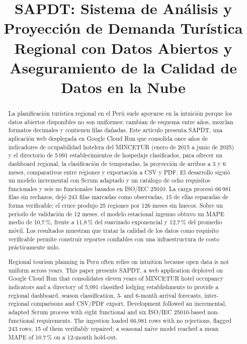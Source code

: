 \documentclass[conference]{IEEEtran}
\begin{document}
\title{SAPDT: Sistema de Análisis y Proyección de Demanda Turística Regional con Datos Abiertos y Aseguramiento de la Calidad de Datos en la Nube}

\author{
}

\maketitle

\begin{abstract}
La planificación turística regional en el Perú suele apoyarse en la intuición porque los datos abiertos disponibles no son uniformes: cambian de esquema entre años, mezclan formatos decimales y contienen filas dañadas. Este artículo presenta SAPDT, una aplicación web desplegada en Google Cloud Run que consolida once años de indicadores de ocupabilidad hotelera del MINCETUR (enero de 2015 a junio de 2025) y el directorio de 5\,091 establecimientos de hospedaje clasificados, para ofrecer un dashboard regional, la clasificación de temporadas, la proyección de arribos a 3 y 6 meses, comparativos entre regiones y exportación a CSV y PDF. El desarrollo siguió un modelo incremental con Scrum adaptado y un catálogo de ocho requisitos funcionales y seis no funcionales basados en ISO/IEC 25010. La carga procesó 66\,981 filas sin rechazos, dejó 243 filas marcadas como observadas, 15 de ellas reparadas de forma verificable; el cruce produjo 25 regiones por 126 meses sin huecos. Sobre un periodo de validación de 12 meses, el modelo estacional ingenuo obtuvo un MAPE medio de 10,7\,\%, frente a 11,8\,\% del suavizado exponencial y 12,7\,\% del promedio móvil. Los resultados muestran que tratar la calidad de los datos como requisito verificable permite construir reportes confiables con una infraestructura de costo prácticamente nulo.
\end{abstract}

\renewcommand{\abstractname}{Abstract}
\begin{abstract}
Regional tourism planning in Peru often relies on intuition because open data is not uniform across years. This paper presents SAPDT, a web application deployed on Google Cloud Run that consolidates eleven years of MINCETUR hotel occupancy indicators and a directory of 5,091 classified lodging establishments to provide a regional dashboard, season classification, 3- and 6-month arrival forecasts, inter-regional comparisons and CSV/PDF export. Development followed an incremental, adapted Scrum process with eight functional and six ISO/IEC 25010-based non-functional requirements. The ingestion loaded 66,981 rows with no rejections, flagged 243 rows, 15 of them verifiably repaired; a seasonal naïve model reached a mean MAPE of 10.7\,\% on a 12-month hold-out.
\end{abstract}
\end{document}
